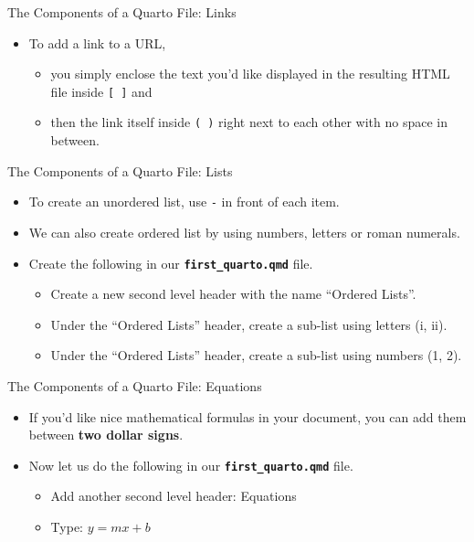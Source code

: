 \documentclass[
  ignorenonframetext,
]{beamer}
\providecommand{\tightlist}{%
  \setlength{\itemsep}{0pt}\setlength{\parskip}{0pt}}
\begin{document}
\begin{frame}[fragile]{The Components of a Quarto File: Links}
\protect\hypertarget{the-components-of-a-quarto-file-links}{}
\begin{itemize}
\item
  To add a link to a URL,

  \begin{itemize}
  \tightlist
  \item
    you simply enclose the text you'd like displayed in the resulting
    HTML file inside \texttt{{[}\ {]}} and
  \item
    then the link itself inside \texttt{(\ )} right next to each other
    with no space in between.
  \end{itemize}
\end{itemize}
\end{frame}

\begin{frame}[fragile]{The Components of a Quarto File: Lists}
\protect\hypertarget{the-components-of-a-quarto-file-lists}{}
\begin{itemize}
\item
  To create an unordered list, use \texttt{-} in front of each item.
\item
  We can also create ordered list by using numbers, letters or roman
  numerals.
\item
  Create the following in our \textbf{\texttt{first\_quarto.qmd}} file.

  \begin{itemize}
  \tightlist
  \item
    Create a new second level header with the name ``Ordered Lists''.
  \item
    Under the ``Ordered Lists'' header, create a sub-list using letters
    (i, ii).
  \item
    Under the ``Ordered Lists'' header, create a sub-list using numbers
    (1, 2).
  \end{itemize}
\end{itemize}
\end{frame}

\begin{frame}[fragile]{The Components of a Quarto File: Equations}
\protect\hypertarget{the-components-of-a-quarto-file-equations}{}
\begin{itemize}
\item
  If you'd like nice mathematical formulas in your document, you can add
  them between \textbf{two dollar signs}.
\item
  Now let us do the following in our \textbf{\texttt{first\_quarto.qmd}}
  file.

  \begin{itemize}
  \tightlist
  \item
    Add another second level header: Equations
  \item
    Type: \(y = mx + b\)
  \end{itemize}
\end{itemize}
\end{frame}
\end{document}
